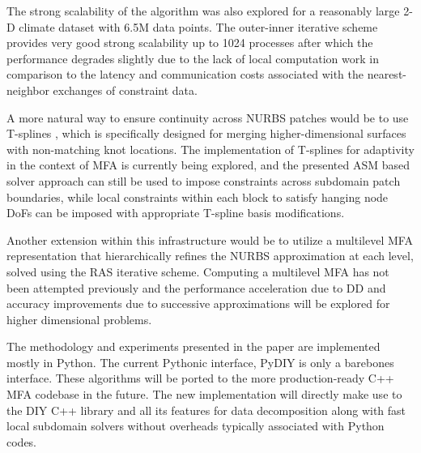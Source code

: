\documentclass[conference]{IEEEtran}
\begin{document}
The strong scalability of the algorithm was also explored for a reasonably large 2-D climate dataset with 6.5M data points. The outer-inner iterative scheme provides very good strong scalability up to 1024 processes after which the performance degrades slightly due to the lack of local computation work in comparison to the latency and communication costs associated with the nearest-neighbor exchanges of constraint data. 

A more natural way to ensure continuity across NURBS patches would be to use T-splines \cite{sederberg-2004}, which is specifically designed for merging higher-dimensional surfaces with non-matching knot locations. The implementation of T-splines for adaptivity in the context of MFA is currently being explored, and the presented ASM based solver approach can still be used to impose constraints across subdomain patch boundaries, while local constraints within each block to satisfy hanging node DoFs can be imposed with appropriate T-spline basis modifications.

Another extension within this infrastructure would be to utilize a multilevel MFA representation that hierarchically refines the NURBS approximation at each level, solved using the RAS iterative scheme. Computing a multilevel MFA has not been attempted previously and the performance acceleration due to DD and accuracy improvements due to successive approximations will be explored for higher dimensional problems.

The methodology and experiments presented in the paper are implemented mostly in Python. The current Pythonic interface, PyDIY is only a barebones interface. These algorithms will be ported to the more production-ready C++ MFA codebase \cite{mfa-codebase} in the future. The new implementation will directly make use to the DIY C++ library and all its features for data decomposition along with fast local subdomain solvers without overheads typically associated with Python codes. 

\end{document}
